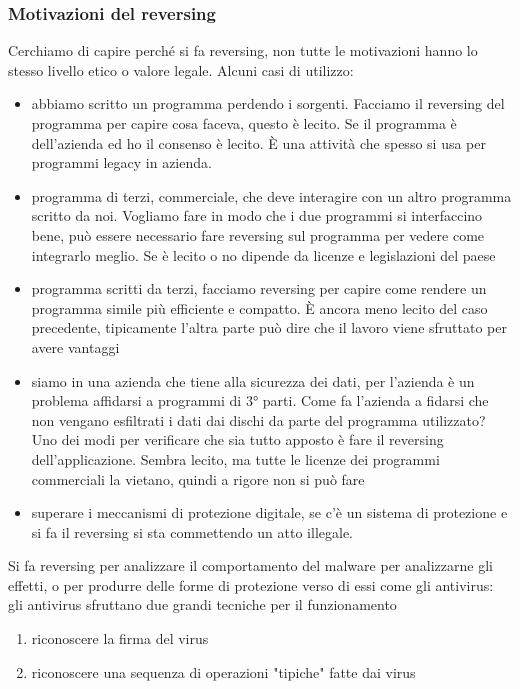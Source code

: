 \documentclass[12pt, oneside]{extbook}
\begin{document}
\subsubsection{Motivazioni del reversing}
Cerchiamo di capire perché si fa reversing, non tutte le motivazioni hanno lo stesso livello etico o valore legale. Alcuni casi di utilizzo:
\begin{itemize}
\item abbiamo scritto un programma perdendo i sorgenti. Facciamo il reversing del programma per capire cosa faceva, questo è lecito. Se il programma è dell'azienda ed ho il consenso è lecito. È una attività che spesso si usa per programmi legacy in azienda.
\item programma di terzi, commerciale, che deve interagire con un altro programma scritto da noi. Vogliamo fare in modo che i due programmi si interfaccino bene, può essere necessario fare reversing sul programma per vedere come integrarlo meglio. Se è lecito o no dipende da licenze e legislazioni del paese
\item programma scritti da terzi, facciamo reversing per capire come rendere un programma simile più efficiente e compatto. È ancora meno lecito del caso precedente, tipicamente l'altra parte può dire che il lavoro viene sfruttato per avere vantaggi
\item siamo in una azienda che tiene alla sicurezza dei dati, per l'azienda è un problema affidarsi a programmi di 3° parti. Come fa l'azienda a fidarsi che non vengano esfiltrati i dati dai dischi da parte del programma utilizzato? Uno dei modi per verificare che sia tutto apposto è fare il reversing dell'applicazione. Sembra lecito, ma tutte le licenze dei programmi commerciali la vietano, quindi a rigore non si può fare
\item superare i meccanismi di protezione digitale, se c'è un sistema di protezione e si fa il reversing si sta commettendo un atto illegale.
\end{itemize}
Si fa reversing per analizzare il comportamento del malware per analizzarne gli effetti, o per produrre delle forme di protezione verso di essi come gli antivirus: gli antivirus sfruttano due grandi tecniche per il funzionamento
\begin{enumerate}
\item riconoscere la firma del virus
\item riconoscere una sequenza di operazioni "tipiche" fatte dai virus 
\end{enumerate}
\end{document}
